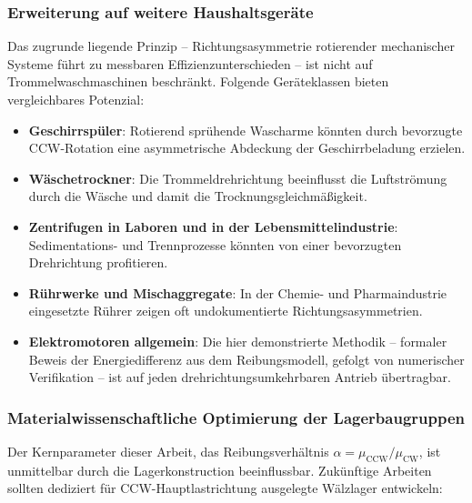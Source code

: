 ﻿\documentclass[12pt,a4paper]{article}
\theoremstyle{remark}
\newcommand{\CCW}{\mathrm{CCW}}
\newcommand{\CW}{\mathrm{CW}}
\begin{document}
	\subsubsection{Erweiterung auf weitere Haushaltsgeräte}
	
	Das zugrunde liegende Prinzip -- Richtungsasymmetrie rotierender mechanischer Systeme
	führt zu messbaren Effizienzunterschieden -- ist nicht auf Trommelwaschmaschinen
	beschränkt. Folgende Geräteklassen bieten vergleichbares Potenzial:
	
	\begin{itemize}
		\item \textbf{Geschirrspüler}: Rotierend sprühende Wascharme könnten durch
		bevorzugte CCW-Rotation eine asymmetrische Abdeckung der Geschirrbeladung erzielen.
		\item \textbf{Wäschetrockner}: Die Trommeldrehrichtung beeinflusst die Luftströmung
		durch die Wäsche und damit die Trocknungsgleichmäßigkeit.
		\item \textbf{Zentrifu\-gen in Laboren und in der Lebensmittelindustrie}: Sedimentations-
		und Trennprozesse könnten von einer bevorzugten Drehrichtung profitieren.
		\item \textbf{Rührwerke und Mischaggregate}: In der Chemie- und Pharmaindustrie
		eingesetzte Rührer zeigen oft undokumentierte Richtungsasymmetrien.
		\item \textbf{Elektromotoren allgemein}: Die hier demonstrierte Methodik -- formaler
		Beweis der Energiedifferenz aus dem Reibungsmodell, gefolgt von numerischer Verifikation --
		ist auf jeden drehrichtungsumkehrbaren Antrieb übertragbar.
	\end{itemize}
	
	\subsubsection{Materialwissenschaftliche Optimierung der Lagerbaugruppen}
	
	Der Kernparameter dieser Arbeit, das Reibungsverhältnis $\alpha = \mu_{\CCW}/\mu_{\CW}$,
	ist unmittelbar durch die Lagerkonstruction beeinflussbar. Zukünftige Arbeiten sollten
	dediziert für CCW-Hauptlastrichtung ausgelegte Wälzlager entwickeln:
	
\end{document}
